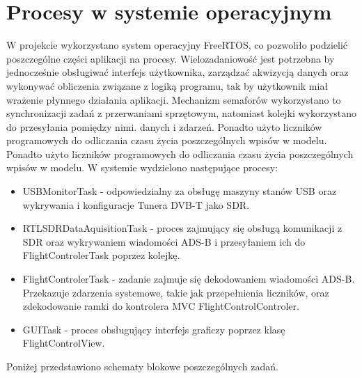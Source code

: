 \documentclass[eng,printmode]{mgr}
\begin{document}
\section{Procesy w systemie operacyjnym}
W projekcie wykorzystano system operacyjny FreeRTOS, co pozwoliło podzielić poszczególne części aplikacji na procesy. Wielozadaniowość jest potrzebna by jednocześnie obsługiwać interfejs użytkownika, zarządzać akwizycją danych oraz wykonywać obliczenia związane z logiką programu, tak by użytkownik miał wrażenie płynnego działania aplikacji. Mechanizm semaforów wykorzystano to synchronizacji zadań z przerwaniami sprzętowym, natomiast kolejki wykorzystano do przesyłania pomiędzy nimi. danych i zdarzeń. Ponadto użyto liczników programowych do odliczania czasu życia poszczególnych wpisów w modelu. Ponadto użyto liczników programowych do odliczania czasu życia poszczególnych wpisów w modelu.
\newpage
\noindent
W systemie wydzielono następujące procesy:
\begin{itemize}
\item USBMonitorTask - odpowiedzialny za obsługę maszyny stanów USB oraz wykrywania i konfiguracje Tunera DVB-T jako SDR. 
  
\item RTLSDRDataAquisitionTask - proces zajmujący się obsługą komunikacji z SDR oraz wykrywaniem wiadomości ADS-B i przesyłaniem ich do FlightControlerTask poprzez kolejkę.
    
\item FlightControlerTask - zadanie zajmuje się dekodowaniem wiadomości ADS-B. Przekazuje zdarzenia systemowe, takie jak przepełnienia liczników, oraz zdekodowanie ramki do kontrolera MVC FlightControlControler.

\item GUITask - proces obsługujący interfejs graficzy poprzez klasę FlightControlView.
\end{itemize}
\noindent
Poniżej przedstawiono schematy blokowe poszczególnych zadań.
\end{document}
